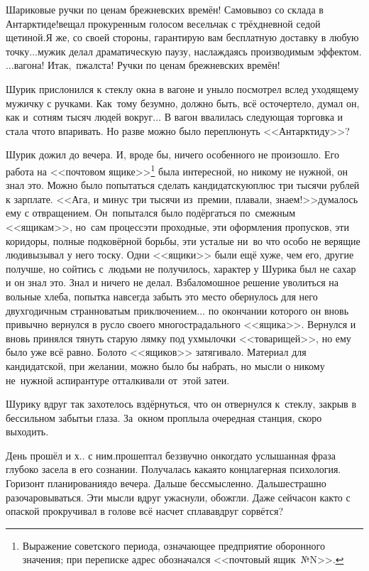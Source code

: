 {	\diagdash Шариковые ручки по ценам брежневских времён! Самовывоз со склада в Антарктиде!\mdash вещал прокуренным голосом весельчак с трёхдневной седой щетиной.\mdash Я же, со своей стороны, гарантирую вам бесплатную доставку в любую точку$\ldots$\mdash мужик делал драматическую паузу, наслаждаясь производимым эффектом.\mdash $\ldots$вагона! Итак,~пжалста! Ручки по ценам брежневских времён!%
	
	Шурик прислонился к стеклу окна в вагоне и уныло посмотрел вслед уходящему мужичку с ручками. Как~тому безумно, должно быть, всё осточертело, думал он, как и~сотням тысяч людей вокруг$\ldots$ В вагон ввалилась следующая торговка и стала что\sdash то впаривать. Но разве можно было переплюнуть <<Антарктиду>>? 
	
	Шурик дожил до вечера. И, вроде бы, ничего особенного не произошло. Его работа на <<почтовом ящике>>\footnote{Выражение советского периода, означающее предприятие оборонного значения; при переписке адрес обозначался <<почтовый ящик~№N>>.} была интересной, но никому не нужной, он знал это. Можно было попытаться сделать кандидатскую\mdash плюс три тысячи рублей к зарплате. <<Ага, и минус три тысячи из~премии, плавали, знаем!>>\mdash думалось ему с отвращением. Он~попытался было подёргаться по~смежным <<ящикам>>, но~сам процесс\mdash эти проходные, эти оформления пропусков, эти коридоры, полные подковёрной борьбы, эти усталые ни~во что особо не верящие люди\mdash вызывал у него тоску. Одни <<ящики>> были ещё хуже, чем его, другие получше, но сойтись с~людьми не получилось, характер у Шурика был не сахар и он знал это. Знал и ничего не делал. Взбаломошное решение уволиться на вольные хлеба, попытка навсегда забыть это место обернулось для него двухгодичным странноватым приключением$\ldots$ по окончании которого он вновь привычно вернулся в русло своего многострадального <<ящика>>. Вернулся и вновь принялся тянуть старую лямку под ухмылочки <<товарищей>>, но ему было уже всё равно. Болото <<ящиков>> затягивало. Материал для кандидатской, при желании, можно было бы набрать, но мысли о никому не~нужной аспирантуре отталкивали от~этой затеи.%
	
	Шурику вдруг так захотелось вздёрнуться, что он отвернулся к~стеклу, закрыв в бессильном забытьи глаза. За~окном проплыла очередная станция, скоро выходить.
	
	\diagdash День прошёл и х.. с ним.\mdash прошептал беззвучно он\mdash когда\sdash то услышанная фраза глубоко засела в его сознании. Получалась какая\sdash то концлагерная психология. Горизонт планирования\mdash до вечера. Дальше бессмысленно. Дальше\mdash страшно разочаровываться. Эти мысли вдруг ужаснули, обожгли. Даже сейчас\mdash он как\sdash то с опаской прокручивал в голове всё насчет сплава\mdash вдруг сорвётся? 
	
}
